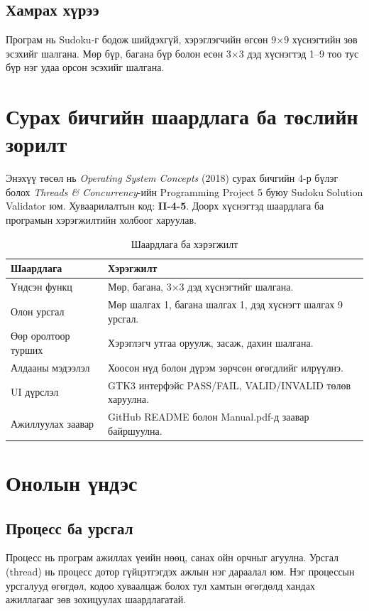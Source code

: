 \documentclass[12pt,a4paper]{report}
\begin{document}
\section{Хамрах хүрээ}
Програм нь Sudoku-г бодож шийдэхгүй, хэрэглэгчийн өгсөн 9$\times$9 хүснэгтийн зөв эсэхийг шалгана. Мөр бүр, багана бүр болон есөн 3$\times$3 дэд хүснэгтэд 1--9 тоо тус бүр нэг удаа орсон эсэхийг шалгана.

\chapter{Сурах бичгийн шаардлага ба төслийн зорилт}
Энэхүү төсөл нь \textit{Operating System Concepts} (2018) сурах бичгийн 4-р бүлэг болох \textit{Threads \& Concurrency}-ийн Programming Project 5 буюу Sudoku Solution Validator юм. Хуваарилалтын код: \textbf{II-4-5}. Доорх хүснэгтэд шаардлага ба програмын хэрэгжилтийн холбоог харуулав.
\begin{table}[H]\centering\caption{Шаардлага ба хэрэгжилт}\begin{tabular}{p{}p{}}\toprule
\textbf{Шаардлага}&\textbf{Хэрэгжилт}\\\midrule
Үндсэн функц&Мөр, багана, 3$\times$3 дэд хүснэгтийг шалгана.\\
Олон урсгал&Мөр шалгах 1, багана шалгах 1, дэд хүснэгт шалгах 9 урсгал.\\
Өөр оролтоор турших&Хэрэглэгч утгаа оруулж, засаж, дахин шалгана.\\
Алдааны мэдээлэл&Хоосон нүд болон дүрэм зөрчсөн өгөгдлийг илрүүлнэ.\\
UI дүрслэл&GTK3 интерфэйс PASS/FAIL, VALID/INVALID төлөв харуулна.\\
Ажиллуулах заавар&GitHub README болон Manual.pdf-д заавар байршуулна.\\\bottomrule\end{tabular}\end{table}

\chapter{Онолын үндэс}
\section{Процесс ба урсгал}
Процесс нь програм ажиллах үеийн нөөц, санах ойн орчныг агуулна. Урсгал (thread) нь процесс дотор гүйцэтгэгдэх ажлын нэг дараалал юм. Нэг процессын урсгалууд өгөгдөл, кодоо хуваалцаж болох тул хамтын өгөгдөлд хандах ажиллагааг зөв зохицуулах шаардлагатай.
\end{document}
